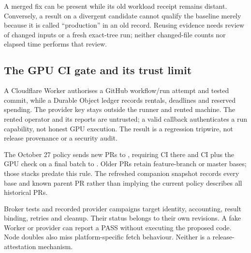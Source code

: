 A merged fix can be present while its old workload receipt remains distant. Conversely,
a result on a divergent candidate cannot qualify the baseline merely because it is called
``production'' in an old record. Reusing evidence needs review of changed inputs or a fresh
exact-tree run; neither changed-file counts nor elapsed time performs that review.

\subsection{The GPU CI gate and its trust limit}

\doc A Cloudflare Worker authorises a GitHub workflow/run attempt and tested commit, while
a Durable Object ledger records rentals, deadlines and reserved spending. The provider key
stays outside the runner and rented machine. The rented operator and its reports are untrusted;
a valid callback authenticates a run capability, not honest GPU execution. The result is a
regression tripwire, not release provenance or a security audit.

\doc The October 27 policy sends new PRs to , requiring CI there and CI plus the
GPU check on a final batch to . Older PRs retain feature-branch or master bases;
those stacks predate this rule. The refreshed companion snapshot records every base and
known parent PR rather than implying the current policy describes all historical PRs.

{Broker tests and recorded provider campaigns target identity, accounting, result binding,
retries and cleanup. Their status belongs to their own revisions.}
{A fake Worker or provider can report a PASS without executing the proposed code. Node doubles
also miss platform-specific fetch behaviour. Neither is a release-attestation mechanism.}

